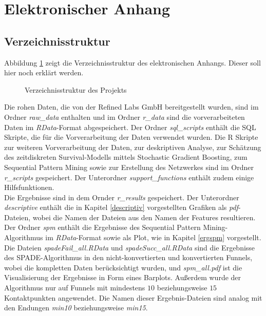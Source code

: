 \section{Elektronischer Anhang}\label{anhang}

\subsection{Verzeichnisstruktur}
Abbildung \ref{verz} zeigt die Verzeichnisstruktur des elektronischen Anhangs. Dieser soll hier noch erklärt werden.
\begin{figure}[H]
\caption{Verzeichnisstruktur des Projekts}\label{verz}
\end{figure}
Die rohen Daten, die von der Refined Labs GmbH bereitgestellt wurden, sind im Ordner \textit{raw\_data} enthalten und im Ordner \textit{r\_data} sind die vorverarbeiteten Daten im \textit{RData}-Format abgespeichert. Der Ordner \textit{sql\_scripts} enthält die SQL Skripte, die für die Vorverarbeitung der Daten verwendet wurden. Die R Skripte zur weiteren Vorverarbeitung der Daten, zur deskriptiven Analyse, zur Schätzung des zeitdiskreten Survival-Modells mittels Stochastic Gradient Boosting, zum Sequential Pattern Mining sowie zur Erstellung des Netzwerkes sind im Ordner \textit{r\_scripts} gespeichert. Der Unterordner \textit{support\_functions} enthält zudem einige Hilfsfunktionen.\\
Die Ergebnisse sind in dem Ornder \textit{r\_results} gespeichert. Der Unterordner \textit{descriptive} enthält die in Kapitel \ref{descriptiv} vorgestellten Grafiken als \textit{pdf}-Dateien, wobei die Namen der Dateien aus den Namen der Features resultieren.\\
Der Ordner \textit{spm} enthält die Ergebnisse des Sequential Pattern Mining-Algorithmus im \textit{RData}-Format sowie als Plot, wie in Kapitel \ref{ergspm} vorgestellt. Die Dateien \textit{spadeFail\_all.RData} und \textit{spadeSucc\_all.RData} sind die Ergebnisse des SPADE-Algorithmus in den nicht-konvertierten und konvertierten Funnels, wobei die kompletten Daten berücksichtigt wurden, und \textit{spm\_all.pdf} ist die Visualisierung der Ergebnisse in Form eines Barplots. Außerdem wurde der Algorithmus nur auf Funnels mit mindestens $10$ beziehungsweise $15$ Kontaktpunkten angewendet. Die Namen dieser Ergebnis-Dateien sind analog mit den Endungen \textit{min10} beziehungsweise \textit{min15}.\\
